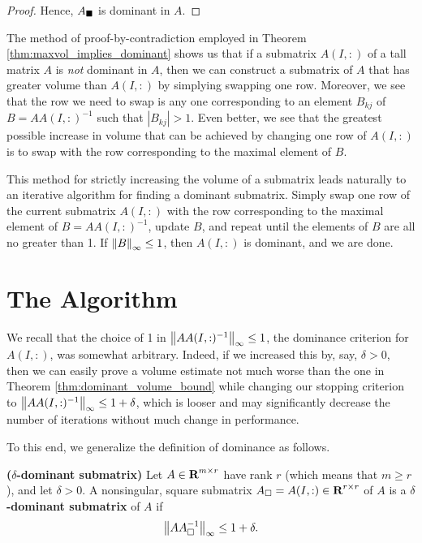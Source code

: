 \documentclass{article}
\begin{document}
\begin{thm}
\begin{proof}
			Hence, $A_\blacksquare$ is dominant in $A$.
		\end{proof}
	\end{thm}
	
	
	The method of proof-by-contradiction employed in Theorem \ref{thm:maxvol_implies_dominant} shows us that if a submatrix $A(I,:)$ of a tall matrix $A$ is \textit{not} dominant in $A$, then we can construct a submatrix of $A$ that has greater volume than $A(I,:)$ by simplying swapping one row. Moreover, we see that the row we need to swap is any one corresponding to an element $B_{kj}$ of $B = AA(I,:)^{-1}$ such that $|B_{kj}| > 1$. Even better, we see that the greatest possible increase in volume that can be achieved by changing one row of $A(I,:)$ is to swap with the row corresponding to the maximal element of $B$.
	
	This method for strictly increasing the volume of a submatrix leads naturally to an iterative algorithm for finding a dominant submatrix. Simply swap one row of the current submatrix $A(I,:)$ with the row corresponding to the maximal element of $B = AA(I,:)^{-1}$, update $B$, and repeat until the elements of $B$ are all no greater than 1. If $\left\lVert B \right\rVert_\infty \le 1$, then $A(I,:)$ is dominant, and we are done.
	
	\section{The \maxvol{} Algorithm}
	
	
	We recall that the choice of 1 in $\left\lVert AA(I,:)^{-1} \right\rVert_\infty \le 1$, the dominance criterion for $A(I,:)$, was somewhat arbitrary. Indeed, if we increased this by, say, $\delta > 0$, then we can easily prove a volume estimate not much worse than the one in Theorem \ref{thm:dominant_volume_bound} while changing our stopping criterion to $\left\lVert AA(I,:)^{-1} \right\rVert_\infty \le 1 + \delta$, which is looser and may significantly decrease the number of iterations without much change in performance.
	
	To this end, we generalize the definition of dominance as follows.
	
	\begin{dfn} \textnormal{\bf($\delta$-dominant submatrix)}
		\label{def:delta_dominant_submatrix}
		Let $A \in \textnormal{\bf R}^{m\times r}$ have rank $r$ (which means that $m \ge r$), and let $\delta > 0$. A nonsingular, square submatrix $A_\square = A(I,:) \in \textnormal{\bf R}^{r\times r}$ of $A$ is a \textbf{$\delta$-dominant submatrix} of $A$ if
		\begin{equation}
			\left\lVert AA_{\square}^{-1} \right\rVert_\infty \le 1 + \delta.
		\end{equation}
	\end{dfn}
	
\end{document}
